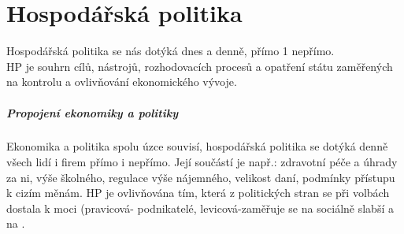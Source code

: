 \chapter{Hospodářská politika}

Hospodářská politika se nás dotýká dnes a denně, přímo 1 nepřímo. \\
HP je souhrn cílů, nástrojů, rozhodovacích procesů a opatření státu zaměřených na kontrolu a ovlivňování ekonomického vývoje.

\paragraph*{Propojení ekonomiky a politiky}
Ekonomika a politika spolu úzce souvisí, hospodářská politika se dotýká denně všech lidí i firem přímo i nepřímo. Její součástí je např.: zdravotní péče a úhrady za ni, výše školného, regulace výše nájemného,
velikost daní, podmínky přístupu k cizím měnám. HP je ovlivňována tím, která z politických stran se při volbách dostala k moci (pravicová-
podnikatelé, levicová-zaměřuje se na sociálně slabší a na .

